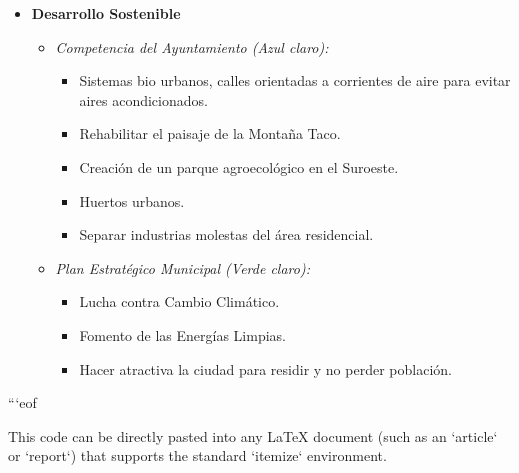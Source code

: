 \begin{itemize}
\begin{itemize}
        \item \textbf{Desarrollo Sostenible}
        \begin{itemize}
            \item \textit{Competencia del Ayuntamiento (Azul claro):}
            \begin{itemize}
                \item Sistemas bio urbanos, calles orientadas a corrientes de aire para evitar aires acondicionados.
                \item Rehabilitar el paisaje de la Montaña Taco.
                \item Creación de un parque agroecológico en el Suroeste.
                \item Huertos urbanos.
                \item Separar industrias molestas del área residencial.
            \end{itemize}
            \item \textit{Plan Estratégico Municipal (Verde claro):}
            \begin{itemize}
                \item Lucha contra Cambio Climático.
                \item Fomento de las Energías Limpias.
                \item Hacer atractiva la ciudad para residir y no perder población.
            \end{itemize}
        \end{itemize}
    \end{itemize}
\end{itemize}
```eof

This code can be directly pasted into any LaTeX document (such as an `article` or `report`) that supports the standard `itemize` environment.